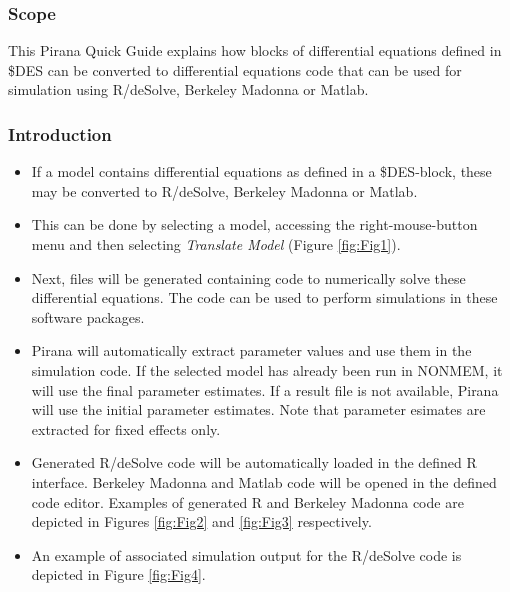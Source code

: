 \begin{center}
   {\colorbox{grey2}{
         \begin{minipage}[t]{0.9\textwidth}
\subsubsection*{Scope}
This Pirana Quick Guide explains how blocks of differential equations
defined in \$DES can be converted to differential equations code
that can be used for simulation using R/deSolve, Berkeley Madonna or Matlab.
          \end{minipage}
      }
   }
\end{center}


\subsubsection*{Introduction}
\begin{itemize}
\item If a model contains differential equations as defined in a
  \$DES-block, these may be converted to R/deSolve, Berkeley Madonna
  or Matlab.
\item This can be done by selecting a model, accessing the
  right-mouse-button menu and then selecting \emph{Translate Model}
  (Figure \ref{fig:Fig1}).
\item Next, files will be generated containing code to numerically
  solve these differential equations. The code can be used to perform
  simulations in these software packages.
\item Pirana will automatically extract parameter values and use them
  in the simulation code. If the selected model has already been run
  in NONMEM, it will use the final parameter estimates. If a result
  file is not available, Pirana will use the initial parameter
  estimates. Note that parameter esimates are extracted for fixed
  effects only. 
\item Generated R/deSolve code will be automatically loaded in the
  defined R interface. Berkeley Madonna and Matlab code will be opened
  in the defined code editor. Examples of generated R and Berkeley
  Madonna code are depicted in Figures \ref{fig:Fig2} and \ref{fig:Fig3} respectively.
\item An example of associated simulation output for the R/deSolve
  code is depicted in Figure \ref{fig:Fig4}.  
\end{itemize}

